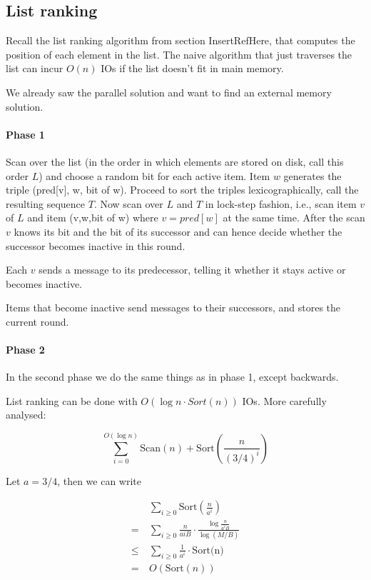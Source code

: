 \subsection{List ranking}

Recall the list ranking algorithm from section InsertRefHere, that computes the position of each element in the list. The naive algorithm that just traverses the list can incur $O(n)$ IOs if the list doesn't fit in main memory. 

We already saw the parallel solution and want to find an external memory solution.

\paragraph{Phase 1} Scan over the list (in the order in which elements are stored on disk, call this order $L$) and choose a random bit for each active item. Item $w$ generates the triple (pred[v], w, bit of w). Proceed to sort the triples lexicographically, call the resulting sequence $T$. Now scan over $L$ and $T$ in lock-step fashion, i.e., scan item $v$ of $L$ and item (v,w,bit of w) where $v=pred[w]$ at the same time. After the scan $v$ knows its bit and the bit of its successor and can hence decide whether the successor becomes inactive in this round.

Each $v$ sends a message to its predecessor, telling it whether it stays active or becomes inactive.

Items that become inactive send messages to their successors, and stores the current round.

\paragraph{Phase 2} In the second phase we do the same things as in phase 1, except backwards.

\begin{lem} List ranking can be done with $O(\log n \cdot Sort(n))$ IOs. More carefully analysed:

\[\sum_{i=0}^{O(\log n)} \text{Scan}(n) + \text{Sort}(\frac{n}{(3/4)^i})\]
\end{lem}

Let $a=3/4$, then we can write

\begin{align*}
\quad &\sum_{i\geq 0}\text{Sort}(\frac{n}{a^i})\\
=& \sum_{i\geq 0} \frac{n}{aiB}\cdot \frac{\log \frac{n}{a^iB}}{\log (M/B)}\\
\leq & \sum_{i\geq 0} \frac{1}{a^i} \cdot \text{Sort(n)}\\
=& O(\text{Sort}(n))
\end{align*}

